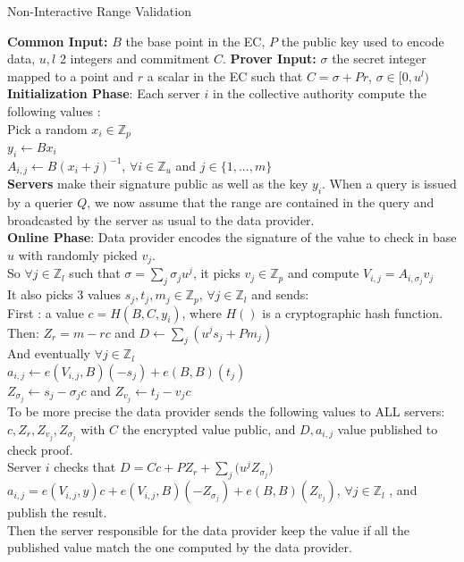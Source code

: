 \documentclass{article}
\begin{document}
\begin{algorithm}[H]
\caption{Non-Interactive Range Validation}\label{euclid}
\begin{algorithmic}[1]
\State \textbf{Common Input:} $B$ the base point in the EC, $P$ the public key used to encode data, $u, l$ 2 integers and commitment $C$.
\State \textbf{Prover Input:} $\sigma$ the secret integer mapped to a point and $r$ a scalar in the EC such that $C = \sigma + Pr$, $\sigma \in [0,u^l)$\\

\State \textbf{Initialization Phase}: Each server $i$ in the collective authority compute the following values :\\
Pick a random $x_i \in \mathbb{Z}_p$\\
$y_i \gets Bx_i$\\
$A_{i,j} \gets B(x_i + j)^{-1} $, $\forall i \in \mathbb{Z}_u$ and $j \in \{1,...,m\}$\\
\State  \textbf{Servers} make their signature public as well as the key $y_i$. When a query is issued by a querier $Q$, we now assume that the range are contained in the query and broadcasted by the server as usual to the data provider.\\

\State \textbf{Online Phase}: Data provider encodes the signature of the value to check in base $u$ with randomly picked $v_j$.\\
So $\forall j \in \mathbb{Z}_l $ such that $ \sigma = \sum_{j}{\sigma_j u^j}$, it picks $v_j \in \mathbb{Z}_p$ and compute $V_{i,j} = A_{i,\sigma_j}v_j$\\
It also picks 3 values $s_j,t_j,m_j \in \mathbb{Z}_p $, $\forall j \in \mathbb{Z}_l$ and sends:\\
First : a value $c = H(B,C,y_i)$, where $H()$ is a cryptographic hash function.\\  Then: $Z_r = m-rc$ and $D \gets \sum_{j}{(u^j s_j + Pm_j)}$\\
And eventually $ \forall j \in \mathbb{Z}_l$\\
$a_{i,j} \gets e(V_{i,j},B)(-s_j)+e(B,B)(t_j)$\\ $Z_{\sigma_j} \gets s_j-\sigma_j c$ and $Z_{v_j} \gets t_j-v_j c$\\
To be more precise the data provider sends the following values to ALL servers: $ c, Z_r, Z_{v_j}, Z_{\sigma_j}$ with $C$ the encrypted value public, and $D, a_{i,j}$ value published to check proof.\\

\State Server $i$ checks that $D = Cc + PZ_r + \sum_{j}{(u^j Z_{\sigma_j}}) $\\
$a_{i,j} = e(V_{i,j},y)c + e(V_{i,j},B)(-Z_{\sigma_j}) + e(B,B)(Z_{v_j})$, $\forall j \in \mathbb{Z}_l$ , and publish the result.\\

Then the server responsible for the data provider keep the value if all the published value match the one computed by the data provider.
\end{algorithmic}
\end{algorithm}
\end{document}
